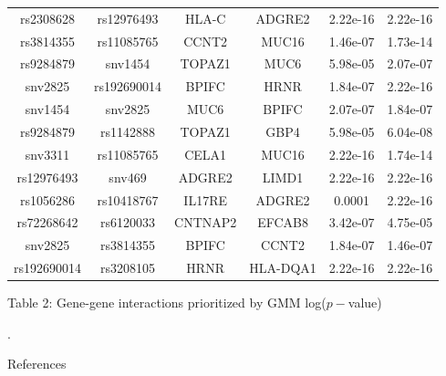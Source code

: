 \documentclass[final]{beamer}
\newlength{\onecolwid}
\begin{document}
\begin{frame}[t]
\begin{columns}[t]
\begin{column}{\onecolwid}
{\begin{table}
\begin{center}
\begin{tabular}{|cc|cc|cc|}
       rs2308628   & rs12976493  & HLA-C     & ADGRE2   & 2.22e-16  & 2.22e-16 \\
       rs3814355   & rs11085765  & CCNT2     & MUC16    & 1.46e-07  & 1.73e-14 \\
       rs9284879   & snv1454     & TOPAZ1    & MUC6     & 5.98e-05  & 2.07e-07 \\
       snv2825     & rs192690014 & BPIFC     & HRNR     & 1.84e-07  & 2.22e-16 \\
       snv1454     & snv2825     & MUC6      & BPIFC    & 2.07e-07  & 1.84e-07 \\
       rs9284879   & rs1142888   & TOPAZ1    & GBP4     & 5.98e-05  & 6.04e-08 \\
       snv3311     & rs11085765  & CELA1     & MUC16    & 2.22e-16  & 1.74e-14 \\
       rs12976493  & snv469      & ADGRE2    & LIMD1    & 2.22e-16  & 2.22e-16 \\
       rs1056286   & rs10418767  & IL17RE    & ADGRE2   & 0.0001    & 2.22e-16 \\
       rs72268642  & rs6120033   & CNTNAP2 & EFCAB8    & 3.42e-07 & 4.75e-05 \\
       snv2825     & rs3814355   & BPIFC     & CCNT2    & 1.84e-07  & 1.46e-07 \\
       rs192690014 & rs3208105   & HRNR      & HLA-DQA1 &2.22e-16   & 2.22e-16 \\
       \hline
       \end{tabular}
       \end{center} 
       \begin{flushleft}\small{\color{darkblue}Table 2: \color{black} Gene-gene interactions prioritized by GMM log($p-$value)}\end{flushleft}.
           \label{fig:manhattan}
       \end{table}
       }  
        \begin{block}{References}
        \tiny
\end{block}
\end{column}
\end{columns}
\end{frame}
\end{document}
